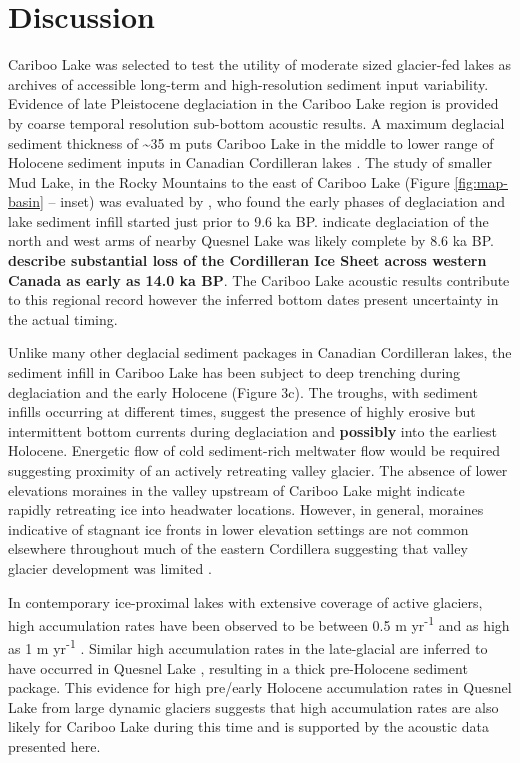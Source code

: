 \documentclass[Royal,times,doublespace,sageh]{sagej}
\begin{document}
\hypertarget{discussion}{%
\section{Discussion}\label{discussion}}

Cariboo Lake was selected to test the utility of moderate sized
glacier-fed lakes as archives of accessible long-term and
high-resolution sediment input variability. Evidence of late Pleistocene
deglaciation in the Cariboo Lake region is provided by coarse temporal
resolution sub-bottom acoustic results. A maximum deglacial sediment
thickness of \textasciitilde35 m puts Cariboo Lake in the middle to
lower range of Holocene sediment inputs in Canadian Cordilleran lakes
\citep[see detailed discussion in][]{Gilbert2012}. The study of smaller
Mud Lake, in the Rocky Mountains to the east of Cariboo Lake (Figure
\ref{fig:map-basin} -- inset) was evaluated by \citet{Hodder2006b}, who
found the early phases of deglaciation and lake sediment infill started
just prior to 9.6 ka BP. \citet{Gilbert2012} indicate deglaciation of
the north and west arms of nearby Quesnel Lake was likely complete by
8.6 ka BP. \textbf{\citet{Menounos2017} describe substantial loss of the
Cordilleran Ice Sheet across western Canada as early as 14.0 ka BP}. The
Cariboo Lake acoustic results contribute to this regional record however
the inferred bottom dates present uncertainty in the actual timing.

Unlike many other deglacial sediment packages in Canadian Cordilleran
lakes, the sediment infill in Cariboo Lake has been subject to deep
trenching during deglaciation and the early Holocene (Figure 3c). The
troughs, with sediment infills occurring at different times, suggest the
presence of highly erosive but intermittent bottom currents during
deglaciation and \textbf{possibly} into the earliest Holocene. Energetic
flow of cold sediment-rich meltwater flow would be required suggesting
proximity of an actively retreating valley glacier. The absence of lower
elevations moraines in the valley upstream of Cariboo Lake might
indicate rapidly retreating ice into headwater locations. However, in
general, moraines indicative of stagnant ice fronts in lower elevation
settings are not common elsewhere throughout much of the eastern
Cordillera suggesting that valley glacier development was limited
\citep{Menounos2017}.

In contemporary ice-proximal lakes with extensive coverage of active
glaciers, high accumulation rates have been observed to be between 0.5 m
yr\textsuperscript{-1} \citep{Crookshanks2008} and as high as 1 m
yr\textsuperscript{-1} \citep{Gilbert1997}. Similar high accumulation
rates in the late-glacial are inferred to have occurred in Quesnel Lake
\citep{Gilbert2012}, resulting in a thick pre-Holocene sediment package.
This evidence for high pre/early Holocene accumulation rates in Quesnel
Lake from large dynamic glaciers suggests that high accumulation rates
are also likely for Cariboo Lake during this time and is supported by
the acoustic data presented here.
\end{document}
